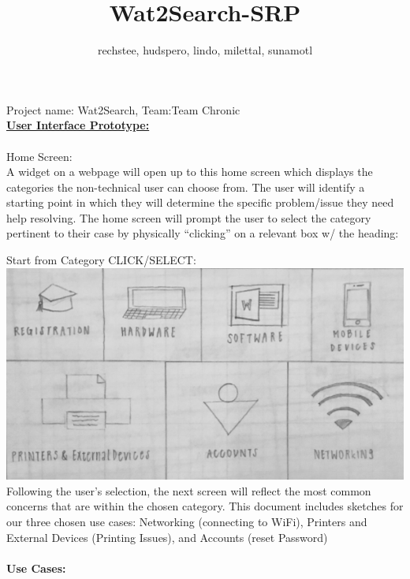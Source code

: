 \documentclass[12pt, letterpaper]{article}
\title{Wat2Search-SRP}
\author{rechstee, hudspero, lindo, milettal, sunamotl 
}
\begin{document}
\maketitle Project name: Wat2Search, Team:Team Chronic
	\\\underline{\textbf{User Interface Prototype:}}
	\\\\Home Screen:
	\\A widget on a webpage will open up to this home screen which displays the categories the non-technical user can choose from.  The user will identify a starting point in which they will determine the specific problem/issue they need help resolving.  The home screen will prompt the user to select the category pertinent to their case by physically “clicking” on a relevant box w/ the heading:
	
	Start from Category
	CLICK/SELECT:
	\\\includegraphics[scale=.75]{home.png}
	\\Following the user’s selection, the next screen will reflect the most common concerns that are within the chosen category.  This document includes sketches for our three chosen use cases: Networking (connecting to WiFi), Printers and External Devices (Printing Issues), and Accounts (reset Password)
	\\\\\textbf{Use Cases:}
	
\end{document}
